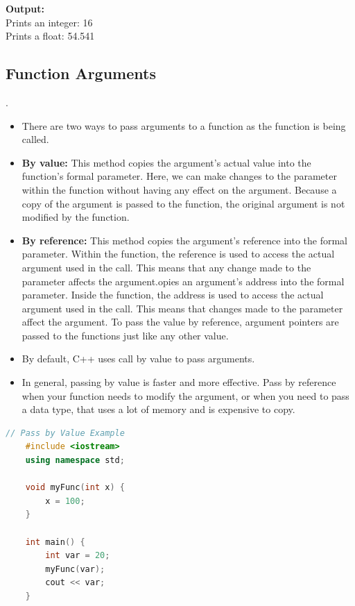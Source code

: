 \documentclass[12pt , a4paper]{article}
\begin{document}
	\begin{tcolorbox}
	\textbf{Output:}\\
	Prints an integer: 16\\
	Prints a float: 54.541
	\end{tcolorbox}


	\subsection{Function Arguments}.

	\begin{itemize}
		\item There are two ways to pass arguments to a function as the function is being called. \\
		\item \textbf{By value:} This method copies the argument's actual value into the function's formal parameter. Here, we can make changes to the parameter within the function without having any effect on the argument. Because a copy of the argument is passed to the function, the original argument is not modified by the function.\\
		\item \textbf{By reference:} This method copies the argument's reference into the formal parameter. Within the function, the reference is used to access the actual argument used in the call. This means that any change made to the parameter affects the argument.opies an argument's address into the formal parameter. Inside the function, the address is used to access the actual argument used in the call. This means that changes made to the parameter affect the argument. To pass the value by reference, argument pointers are passed to the functions just like any other value.\\
		\item By default, C++ uses call by value to pass arguments.\\
		\item In general, passing by value is faster and more effective. Pass by reference when your function needs to modify the argument, or when you need to pass a data type, that uses a lot of memory and is expensive to copy.\\
	\end{itemize}
	\begin{lstlisting}[language=C++]
	// Pass by Value Example
	#include <iostream>
	using namespace std;
	
	void myFunc(int x) {
	    x = 100;
	}
	
	int main() {
	    int var = 20;
	    myFunc(var);
	    cout << var;
	}

	\end{lstlisting}
\end{document}
